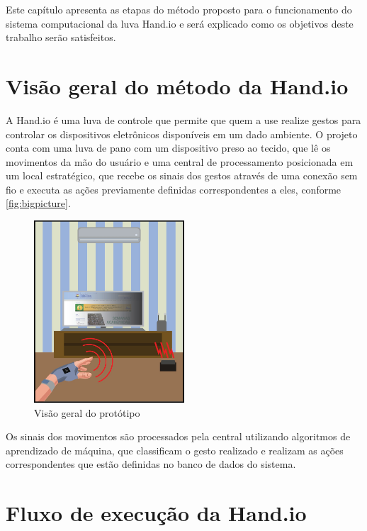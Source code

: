 \label{chapter:metodo}
Este capítulo apresenta as etapas do método proposto para o funcionamento do sistema computacional da luva Hand.io e será explicado como os objetivos deste trabalho serão satisfeitos. 

\section{Visão geral do método da Hand.io}

A Hand.io é uma luva de controle que permite que quem a use realize gestos para controlar os dispositivos eletrônicos disponíveis em um dado ambiente. O projeto conta com uma luva de pano com um dispositivo preso ao tecido, que lê os movimentos da mão do usuário e uma central de processamento posicionada em um local estratégico, que recebe os sinais dos gestos através de uma conexão sem fio e executa as ações previamente definidas correspondentes a eles, conforme \autoref{fig:bigpicture}.

\begin{figure}[ht]
    \centering
    \includegraphics[width=0.5\textwidth, keepaspectratio]{resources/bigpicture.jpeg}
    \caption{Visão geral do protótipo}
    \label{fig:bigpicture}
\end{figure}

Os sinais dos movimentos são processados pela central utilizando algoritmos de aprendizado de máquina, que classificam o gesto realizado e realizam as ações correspondentes que estão definidas no banco de dados do sistema.


\section{Fluxo de execução da Hand.io}

